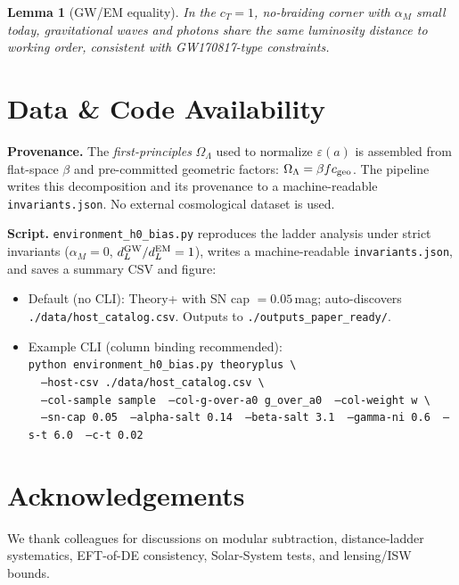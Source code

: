 \documentclass[aps,prd,preprint,onecolumn,longbibliography,nofootinbib]{revtex4-2}
\theoremstyle{plain}
\newtheorem{lemma}[theorem]{Lemma}
\theoremstyle{remark}
\newcommand{\OmL}{\Omega_\Lambda}
\newcommand{\alM}{\alpha_{\!M}}
\newcommand{\be}{\beta}
\newcommand{\eps}{\varepsilon}
\begin{document}
\begin{lemma}[GW/EM equality]\label{lem:gw-em}
In the $c_T\!=\!1$, no-braiding corner with $\alM$ small today, gravitational waves and photons share the same luminosity distance to working order, consistent with GW170817-type constraints.
\end{lemma}

\section*{Data \& Code Availability}
\textbf{Provenance.} The \emph{first-principles} $\OmL$ used to normalize $\eps(a)$ is assembled from flat-space $\be$ and pre-committed geometric factors: $\OmL=\be f c_{\rm geo}$. The pipeline writes this decomposition and its provenance to a machine-readable \texttt{invariants.json}. No external cosmological dataset is used.

\textbf{Script.} \texttt{environment\_h0\_bias.py} reproduces the ladder analysis under strict invariants ($\alM=0$, $d_L^{\rm GW}/d_L^{\rm EM}=1$), writes a machine-readable \texttt{invariants.json}, and saves a summary CSV and figure:
\begin{itemize}
\item Default (no CLI): Theory+ with SN cap $=0.05$\,mag; auto-discovers \texttt{./data/host\_catalog.csv}. Outputs to \texttt{./outputs\_paper\_ready/}.
\item Example CLI (column binding recommended):\\
\texttt{python environment\_h0\_bias.py theoryplus \textbackslash}\\
\texttt{\ \ --host-csv ./data/host\_catalog.csv \textbackslash}\\
\texttt{\ \ --col-sample sample \ --col-g-over-a0 g\_over\_a0 \ --col-weight w \textbackslash}\\
\texttt{\ \ --sn-cap 0.05 \ --alpha-salt 0.14 \ --beta-salt 3.1 \ --gamma-ni 0.6 \ --s-t 6.0 \ --c-t 0.02}
\end{itemize}

\section*{Acknowledgements}
We thank colleagues for discussions on modular subtraction, distance-ladder systematics, EFT-of-DE consistency, Solar-System tests, and lensing/ISW bounds.
\end{document}
